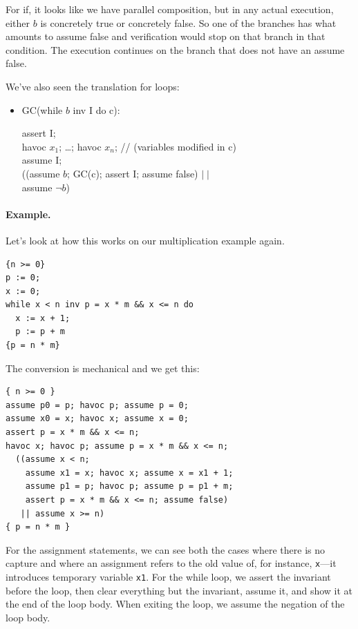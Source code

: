 For \textsf{if}, it looks like we have parallel composition, but in any actual execution, either $b$ is concretely true or concretely false. So one of the branches has what amounts to \textsf{assume false} and verification would stop on that branch in that condition. The execution continues on the branch that does not have an \textsf{assume false}.

We've also seen the translation for loops:
\begin{itemize}[noitemsep]
\item GC(\textsf{while $b$ inv I do c}): \\
\hspace*{2em}
  \begin{minipage}{.8\textwidth}
    \textsf{assert I;} \\
    \textsf{havoc $x_1$; \ldots; havoc $x_n$;} \qquad \qquad // (variables modified in \textsf{c})\\
    \textsf{assume I;} \\
    \textsf{((assume $b$; }GC\textsf{(c); assert I; assume false) $\mid \mid$} \\
    \textsf{\hspace*{1em} assume $\neg b$)}
  \end{minipage}
\end{itemize}

\newpage
\paragraph{Example.} Let's look at how this works on our multiplication example again.
\begin{lstlisting}
{n >= 0} 
p := 0; 
x := 0; 
while x < n inv p = x * m && x <= n do 
  x := x + 1; 
  p := p + m
{p = n * m}
\end{lstlisting}
The conversion is mechanical and we get this:
\begin{lstlisting}
{ n >= 0 }
assume p0 = p; havoc p; assume p = 0; 
assume x0 = x; havoc x; assume x = 0; 
assert p = x * m && x <= n;
havoc x; havoc p; assume p = x * m && x <= n;
  ((assume x < n; 
    assume x1 = x; havoc x; assume x = x1 + 1; 
    assume p1 = p; havoc p; assume p = p1 + m; 
    assert p = x * m && x <= n; assume false) 
   || assume x >= n)
{ p = n * m }
\end{lstlisting}
For the assignment statements, we can see both the cases where there is no capture and where an assignment
refers to the old value of, for instance, \texttt{x}---it introduces temporary variable \texttt{x1}.
For the while loop, we assert the invariant before the loop, then clear everything but the invariant, assume it,
and show it at the end of the loop body. When exiting the loop, we assume the negation of the loop body.

